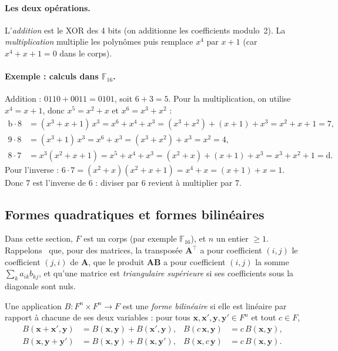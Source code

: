 \paragraph{Les deux opérations.} L'\emph{addition} est le XOR des 4 bits (on additionne les coefficients modulo~2). La \emph{multiplication} multiplie les polynômes puis remplace $x^4$ par $x+1$ (car $x^4+x+1=0$ dans le corps).

\paragraph{Exemple : calculs dans $\mathbb{F}_{16}$.} Addition : $0110+0011=0101$, soit $6+3=5$. Pour la multiplication, on utilise $x^4=x+1$, donc $x^5=x^2+x$ et $x^6=x^3+x^2$ :
\begin{align*}
\mathrm{b}\cdot8&=(x^3+x+1)\,x^3=x^6+x^4+x^3=(x^3+x^2)+(x+1)+x^3=x^2+x+1=7,\\
9\cdot8&=(x^3+1)\,x^3=x^6+x^3=(x^3+x^2)+x^3=x^2=4,\\
8\cdot7&=x^3(x^2+x+1)=x^5+x^4+x^3=(x^2+x)+(x+1)+x^3=x^3+x^2+1=\mathrm{d}.
\end{align*}
Pour l'inverse : $6\cdot7=(x^2+x)(x^2+x+1)=x^4+x=(x+1)+x=1$. Donc $7$ est l'inverse de $6$ : diviser par $6$ revient à multiplier par $7$.

\subsection{Formes quadratiques et formes bilinéaires}
Dans cette section, $F$ est un corps (par exemple $\mathbb{F}_{16}$), et $n$ un entier $\ge1$. Rappelons~\cite{horn} que, pour des matrices, la transposée $\mathbf{A}^{\top}$ a pour coefficient $(i,j)$ le coefficient $(j,i)$ de $\mathbf{A}$, que le produit $\mathbf{A}\mathbf{B}$ a pour coefficient $(i,j)$ la somme $\sum_k a_{ik}b_{kj}$, et qu'une matrice est \emph{triangulaire supérieure} si ses coefficients sous la diagonale sont nuls.

\begin{definition}
Une application $B:F^n\times F^n\to F$ est une \emph{forme bilinéaire} si elle est linéaire par rapport à chacune de ses deux variables : pour tous $\mathbf{x},\mathbf{x}',\mathbf{y},\mathbf{y}'\in F^n$ et tout $c\in F$,
\begin{align*}
B(\mathbf{x}+\mathbf{x}',\mathbf{y})&=B(\mathbf{x},\mathbf{y})+B(\mathbf{x}',\mathbf{y}), & B(c\,\mathbf{x},\mathbf{y})&=c\,B(\mathbf{x},\mathbf{y}),\\
B(\mathbf{x},\mathbf{y}+\mathbf{y}')&=B(\mathbf{x},\mathbf{y})+B(\mathbf{x},\mathbf{y}'), & B(\mathbf{x},c\,\mathbf{y})&=c\,B(\mathbf{x},\mathbf{y}).
\end{align*}
\end{definition}

